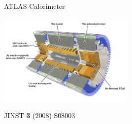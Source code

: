 \documentclass[11pt, xcolor={dvipsnames}, aspectratio=169]{beamer}
\begin{document}

\begin{frame}{ATLAS Calorimeter}
  \centering\footnotesize

  \includegraphics[width=0.5\textwidth]{atlas/atlas_calo}

  JINST \textbf{3} (2008) S08003
\end{frame}

\end{document}
